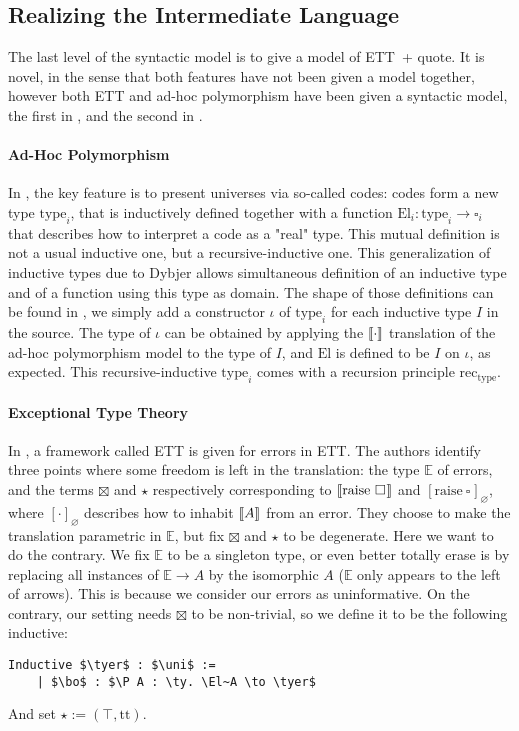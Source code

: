 \documentclass[en]{myarticle}
\renewcommand{\mathtt}{\mathrm}
\newcommand{\uni}[1][]{\square_{#1}}
\renewcommand{\P}{\operatorname{\Pi}}
\newcommand{\unit}{\top}
\DeclareMathOperator{\?}{?}
\newcommand{\rec}{\mathtt{rec}}
\newcommand{\rai}{\mathtt{raise}}
\newcommand{\quo}{\mathtt{quote}}
\newcommand{\ty}{\mathtt{type}}
\newcommand{\El}{\mathtt{El}}
\newcommand{\tyer}{\boxtimes}
\newcommand{\tyerh}{\star}
\newcommand{\bo}{\mathtt{box}}
\newcommand{\ett}{ETT}
\newcommand{\eqcic}{\ett\ + $\quo$}
\begin{document}
{\subsection{Realizing the Intermediate Language}
\label{eahp}

The last level of the syntactic model is to give a model of \eqcic. It is novel, in the sense that both features have not been given a model together, however both ETT and ad-hoc polymorphism have been given a syntactic model, the first in \cite{Pedrot2018}, and the second in \cite{Boulier2017}.

\paragraph{Ad-Hoc Polymorphism}

In \cite{Boulier2017}, the key feature is to present universes via so-called codes: codes form a new type $\ty_i$, that is inductively defined together with a function $\El_i : \ty_i \to \uni[i]$ that describes how to interpret a code as a "real" type. This mutual definition is not a usual inductive one, but a recursive-inductive one. This generalization of inductive types due to Dybjer \cite{Dybjer2000} allows simultaneous definition of an inductive type and of a function using this type as domain. The shape of those definitions can be found in \cite{Boulier2017}, we simply add a constructor $\iota$ of $\ty_i$ for each inductive type $I$ in the source. The type of $\iota$ can be obtained by applying the $\llbracket \cdot \rrbracket$ translation of the ad-hoc polymorphism model to the type of $I$, and $\El$ is defined to be $I$ on $\iota$, as expected. This recursive-inductive $\ty_i$ comes with a recursion principle $\rec_{\ty}$.

\paragraph{Exceptional Type Theory}
In \cite{Pedrot2018}, a framework called ETT is given for errors in ETT. The authors identify three points where some freedom is left in the translation: the type $\mathbb{E}$ of errors, and the terms $\tyer$ and $\tyerh$ respectively corresponding to $\lb \rai~\uni \rb$ and $[ \rai~\uni ]_\varnothing$, where $[\cdot]_\varnothing$ describes how to inhabit $\llbracket A \rrbracket$ from an error. They choose to make the translation parametric in $\mathbb{E}$, but fix $\tyer$ and $\tyerh$ to be degenerate. Here we want to do the contrary. We fix $\mathbb{E}$ to be a singleton type, or even better totally erase is by replacing all instances of $\mathbb{E} \to A$ by the isomorphic $A$ ($\mathbb{E}$ only appears to the left of arrows). This is because we consider our errors as uninformative. On the contrary, our setting needs $\tyer$ to be non-trivial, so we define it to be the following inductive:
\begin{lstlisting}
Inductive $\tyer$ : $\uni$ :=
	| $\bo$ : $\P A : \ty. \El~A \to \tyer$
\end{lstlisting}
And set $\tyerh := (\unit, \mathtt{tt})$.

}
\end{document}
